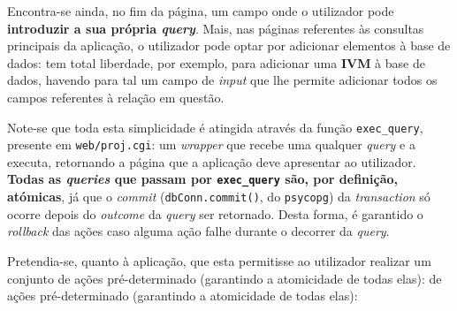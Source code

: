 \documentclass[12pt,a4paper]{article}
\begin{document}
  Encontra-se ainda, no fim da página, um campo onde o utilizador pode
  \textbf{introduzir a sua própria \textit{query}}.
  Mais, nas páginas referentes às consultas principais da aplicação,
  o utilizador pode optar por adicionar elementos à base de dados: tem total
  liberdade, por exemplo, para adicionar uma \textbf{IVM} à base de dados,
  havendo para tal um campo de \textit{input} que lhe permite adicionar todos os
  campos referentes à relação em questão.

  Note-se que toda esta simplicidade é atingida através da função \texttt{exec\_query},
  presente em \texttt{web/proj.cgi}: um \textit{wrapper} que recebe uma qualquer
  \textit{query} e a executa, retornando a página que a aplicação deve apresentar
  ao utilizador. \textbf{Todas as \textit{queries} que passam por \texttt{exec\_query} são,
  por definição, atómicas}, já que o \textit{commit} (\texttt{dbConn.commit()}, do \texttt{psycopg})
  da \textit{transaction} só ocorre depois do \textit{outcome} da \textit{query}
  ser retornado. Desta forma, é garantido o \textit{rollback} das ações caso alguma
  ação falhe durante o decorrer da \textit{query}.

  \vspace*{0.5cm}

  Pretendia-se, quanto à aplicação, que esta permitisse ao utilizador realizar um conjunto
  de ações pré-determinado (garantindo a atomicidade de todas elas):  de ações pré-determinado (garantindo a atomicidade de todas elas):
\end{document}
